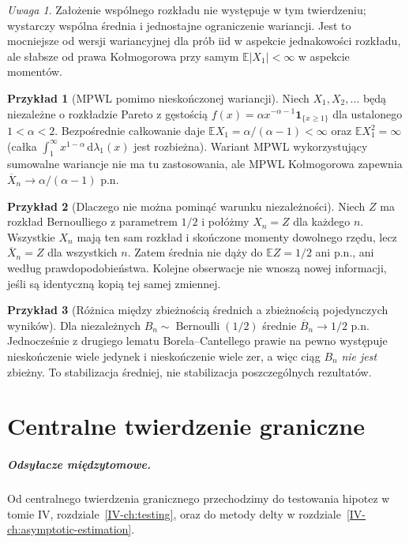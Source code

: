 \documentclass[11pt,a4paper,oneside]{report}
\numberwithin{equation}{chapter}
\theoremstyle{plain}
\theoremstyle{definition}
\newtheorem{przyklad}{Przykład}[chapter]
\theoremstyle{remark}
\newtheorem{uwaga}{Uwaga}[chapter]
\newcommand{\E}{\mathbb{E}}
\newcommand{\ind}[1]{\mathbf{1}_{#1}}
\newcommand{\dd}{\mathrm{d}}
\begin{document}
\begin{uwaga}
Założenie wspólnego rozkładu nie występuje w tym
twierdzeniu; wystarczy wspólna średnia i jednostajne
ograniczenie wariancji. Jest to mocniejsze od
wersji wariancyjnej dla prób iid w aspekcie
jednakowości rozkładu, ale słabsze od prawa Kołmogorowa
przy samym $\E|X_1|<\infty$ w aspekcie momentów.
\end{uwaga}

\begin{przyklad}[MPWL pomimo nieskończonej wariancji]
Niech $X_1,X_2,\ldots$ będą niezależne o rozkładzie
Pareto z gęstością
$f(x)=\alpha x^{-\alpha-1}\ind{\{x\geq1\}}$
dla ustalonego $1<\alpha<2$. Bezpośrednie całkowanie daje
$\E X_1=\alpha/(\alpha-1)<\infty$ oraz
$\E X_1^2=\infty$ (całka
$\int_1^\infty x^{1-\alpha}\,\dd\lambda_1(x)$
jest rozbieżna). Wariant MPWL wykorzystujący
sumowalne wariancje nie ma tu zastosowania, ale
MPWL Kołmogorowa zapewnia
$\overline X_n\to\alpha/(\alpha-1)$ p.n.
\end{przyklad}

\begin{przyklad}[Dlaczego nie można pominąć warunku niezależności]
Niech $Z$ ma rozkład Bernoulliego z parametrem $1/2$
i połóżmy $X_n=Z$ dla każdego $n$. Wszystkie $X_n$
mają ten sam rozkład i skończone momenty dowolnego
rzędu, lecz $\overline X_n=Z$ dla wszystkich $n$.
Zatem średnia nie dąży do $\E Z=1/2$ ani p.n.,
ani według prawdopodobieństwa. Kolejne obserwacje
nie wnoszą nowej informacji, jeśli są identyczną
kopią tej samej zmiennej.
\end{przyklad}

\begin{przyklad}[Różnica między zbieżnością średnich a zbieżnością pojedynczych wyników]
Dla niezależnych $B_n\sim\operatorname{Bernoulli}(1/2)$
średnie $\overline B_n\to1/2$ p.n. Jednocześnie
z drugiego lematu Borela--Cantellego prawie na pewno
występuje nieskończenie wiele jedynek i nieskończenie
wiele zer, a więc ciąg $B_n$ \emph{nie jest} zbieżny.
To stabilizacja średniej, nie stabilizacja
poszczególnych rezultatów.
\end{przyklad}

\chapter{Centralne twierdzenie graniczne}
\label{ch:clt}
\paragraph{Odsyłacze międzytomowe.} Od centralnego twierdzenia granicznego przechodzimy do testowania hipotez w tomie IV, rozdziale~\ref{IV-ch:testing}, oraz do metody delty w rozdziale~\ref{IV-ch:asymptotic-estimation}.
\end{document}
